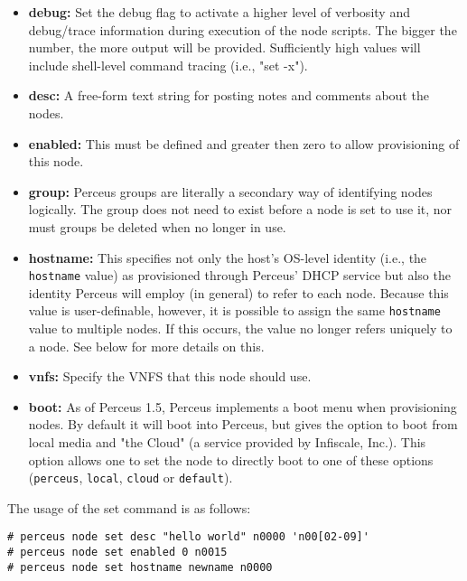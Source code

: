 \documentclass[10pt,letterpaper]{report}
\begin{document}
\begin{itemize}

\item {\bf debug:}  Set the debug flag to activate a higher level of verbosity
and debug/trace information during execution of the node scripts.  The bigger
the number, the more output will be provided.  Sufficiently high values will
include shell-level command tracing (i.e., "set -x").

\item {\bf desc:}  A free-form text string for posting notes and comments
about the nodes.

\item {\bf enabled:}  This must be defined and greater then zero to allow
provisioning of this node.

\item {\bf group:}  Perceus groups are literally a secondary way of
identifying nodes logically.  The group does not need to exist before a node
is set to use it, nor must groups be deleted when no longer in use.

\item {\bf hostname:}  This specifies not only the host's OS-level identity
(i.e., the {\tt hostname} value) as provisioned through Perceus' DHCP
service but also the identity Perceus will employ (in general) to refer to
each node.  Because this value is user-definable, however, it is possible to
assign the same {\tt hostname} value to multiple nodes.  If this occurs, the
value no longer refers uniquely to a node.  See below for more details on
this.

\item {\bf vnfs:}  Specify the VNFS that this node should use.

\item {\bf boot:}  As of Perceus 1.5, Perceus implements a boot menu when
provisioning nodes. By default it will boot into Perceus, but gives the
option to boot from local media and "the Cloud" (a service provided by
Infiscale, Inc.). This option allows one to set the node to directly boot
to one of these options ({\tt perceus}, {\tt local}, {\tt cloud} or
{\tt default}).

\end{itemize}

\noindent The usage of the set command is as follows:

\begin{verbatim}
# perceus node set desc "hello world" n0000 'n00[02-09]'
# perceus node set enabled 0 n0015
# perceus node set hostname newname n0000
\end{verbatim}
\end{document}
